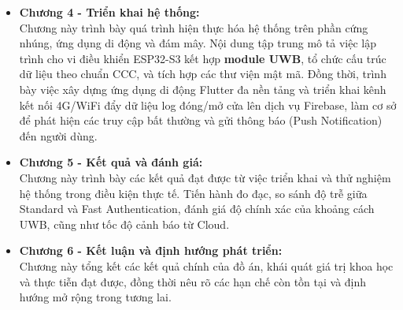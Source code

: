 \begin{itemize}
    \item \textbf{Chương 4 - Triển khai hệ thống:}\\
    Chương này trình bày quá trình hiện thực hóa hệ thống trên phần cứng nhúng, ứng dụng di động và đám mây. Nội dung tập trung mô tả việc lập trình cho vi điều khiển ESP32-S3 kết hợp \textbf{module UWB}, tổ chức cấu trúc dữ liệu theo chuẩn CCC, và tích hợp các thư viện mật mã. Đồng thời, trình bày việc xây dựng ứng dụng di động Flutter đa nền tảng và triển khai kênh kết nối 4G/WiFi đẩy dữ liệu log đóng/mở cửa lên dịch vụ Firebase, làm cơ sở để phát hiện các truy cập bất thường và gửi thông báo (Push Notification) đến người dùng.

    \item \textbf{Chương 5 - Kết quả và đánh giá:}\\
    Chương này trình bày các kết quả đạt được từ việc triển khai và thử nghiệm hệ thống trong điều kiện thực tế. Tiến hành đo đạc, so sánh độ trễ giữa Standard và Fast Authentication, đánh giá độ chính xác của khoảng cách UWB, cũng như tốc độ cảnh báo từ Cloud.

    \item \textbf{Chương 6 - Kết luận và định hướng phát triển:}\\
    Chương này tổng kết các kết quả chính của đồ án, khái quát giá trị khoa học và thực tiễn đạt được, đồng thời nêu rõ các hạn chế còn tồn tại và định hướng mở rộng trong tương lai.
\end{itemize}